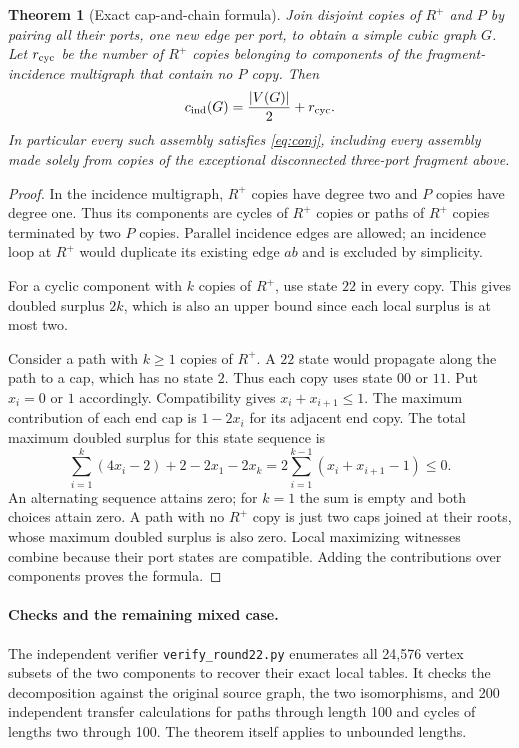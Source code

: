 \documentclass[11pt]{article}
\newtheorem{theorem}{Theorem}[section]
\begin{document}
\begin{theorem}[Exact cap-and-chain formula]\label{thm:cap-chain}
Join disjoint copies of $R^+$ and $P$ by pairing all their ports,
one new edge per port, to obtain a simple cubic graph $G$.
Let $r_{\rm cyc}$ be the number of $R^+$ copies belonging to
components of the fragment-incidence multigraph that contain no
$P$ copy. Then
\[
 c_{\rm ind}(G)=\frac{|V(G)|}{2}+r_{\rm cyc}.
\]
In particular every such assembly satisfies \eqref{eq:conj},
including every assembly made solely from copies of the exceptional
disconnected three-port fragment above.
\end{theorem}
\begin{proof}
In the incidence multigraph, $R^+$ copies have degree two and $P$
copies have degree one. Thus its components are cycles of $R^+$
copies or paths of $R^+$ copies terminated by two $P$ copies.
Parallel incidence edges are allowed; an incidence loop at $R^+$
would duplicate its existing edge $ab$ and is excluded by simplicity.

For a cyclic component with $k$ copies of $R^+$, use state $22$
in every copy. This gives doubled surplus $2k$, which is also an
upper bound since each local surplus is at most two.

Consider a path with $k\geq1$ copies of $R^+$. A $22$ state would
propagate along the path to a cap, which has no state $2$. Thus
each copy uses state $00$ or $11$. Put $x_i=0$ or $1$ accordingly.
Compatibility gives $x_i+x_{i+1}\leq1$. The maximum contribution
of each end cap is $1-2x_i$ for its adjacent end copy. The total
maximum doubled surplus for this state sequence is
\[
 \sum_{i=1}^k(4x_i-2)+2-2x_1-2x_k
 =2\sum_{i=1}^{k-1}(x_i+x_{i+1}-1)\leq0.
\]
An alternating sequence attains zero; for $k=1$ the sum is empty
and both choices attain zero. A path with no $R^+$ copy is just
two caps joined at their roots, whose maximum doubled surplus is
also zero. Local maximizing witnesses combine because their port
states are compatible. Adding the contributions over components
proves the formula.
\end{proof}

\paragraph{Checks and the remaining mixed case.}
The independent verifier \texttt{verify\_round22.py} enumerates all
24,576 vertex subsets of the two components to recover their exact
local tables. It checks the decomposition against the original
source graph, the two isomorphisms, and 200 independent transfer
calculations for paths through length 100 and cycles of lengths two
through 100. The theorem itself applies to unbounded lengths.
\end{document}
